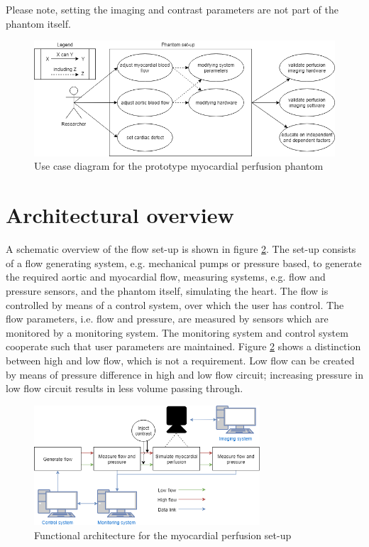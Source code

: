 Please note, setting the imaging and contrast parameters are not part of the phantom itself. 
\begin{figure}[!h]
	\includegraphics[width=\textwidth]{./images/usecase_diagram.png}
	\caption{Use case diagram for the prototype myocardial perfusion phantom}
	\label{fig:usecase}
\end{figure}

\section{Architectural overview}
A schematic overview of the flow set-up is shown in figure \ref{fig:funcarch}. The set-up consists of a flow generating system, e.g. mechanical pumps or pressure based, to generate the required aortic and myocardial flow, measuring systems, e.g. flow and pressure sensors, and the phantom itself, simulating the heart. The flow is controlled by means of a control system, over which the user has control. The flow parameters, i.e. flow and pressure, are measured by sensors which are monitored by a monitoring system. The monitoring system and control system cooperate such that user parameters are maintained. Figure \ref{fig:funcarch} shows a distinction between high and low flow, which is not a requirement. Low flow can be created by means of pressure difference in high and low flow circuit; increasing pressure in low flow circuit results in less volume passing through.
\begin{figure}
	\includegraphics[width=0.75\textwidth]{./images/functional_architecture.png}
	\caption{Functional architecture for the myocardial perfusion set-up}
	\label{fig:funcarch}
\end{figure}
